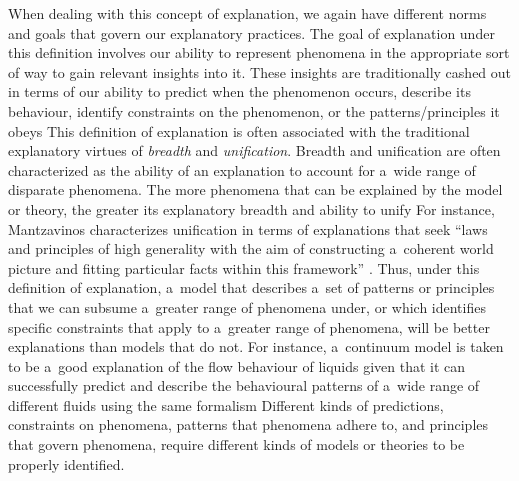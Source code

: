When dealing with this concept of explanation, we again have different norms and goals that govern our explanatory practices. The goal of explanation under this definition involves our ability to represent phenomena in the appropriate sort of way to gain relevant insights into it. These insights are traditionally cashed out in terms of our ability to predict when the phenomenon occurs, describe its behaviour, identify constraints on the phenomenon, or the patterns/principles it obeys
 This definition of explanation is often associated with the traditional explanatory virtues of \textit{breadth} and \textit{unification}. Breadth and unification are often characterized as the ability of an explanation to account for a~wide range of disparate phenomena. The more phenomena that can be explained by the model or theory, the greater its explanatory breadth and ability to unify 
 For instance, Mantzavinos characterizes unification in terms of explanations that seek ``laws and principles of high generality with the aim of constructing a~coherent world picture and fitting particular facts within this framework'' 
\parencite[][footnote]{mantzavinos_explanatory_2016}. %
 Thus, under this definition of explanation, a~model that describes a~set of patterns or principles that we can subsume a~greater range of phenomena under, or which identifies specific constraints that apply to a~greater range of phenomena, will be better explanations than models that do not. For instance, a~continuum model is taken to be a~good explanation of the flow behaviour of liquids given that it can successfully predict and describe the behavioural patterns of a~wide range of different fluids using the same formalism 
 Different kinds of predictions, constraints on phenomena, patterns that phenomena adhere to, and principles that govern phenomena, require different kinds of models or theories to be properly identified.

